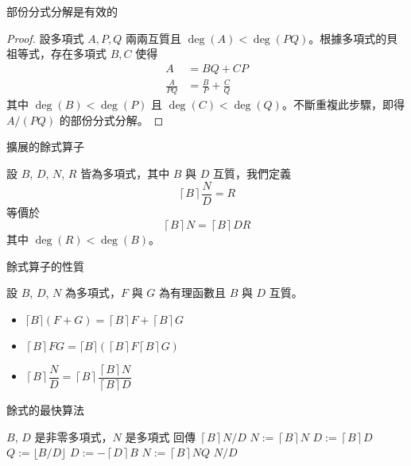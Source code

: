 \documentclass{beamer}
\theoremstyle{remark}
\begin{document}
\begin{CJK}{UTF8}{bsmi}
\begin{frame}{部份分式分解是有效的}
  \begin{proof}
    設多項式 $A,P,Q$ 兩兩互質且 $\deg(A) < \deg(PQ)$。根據多項式的貝祖等式，存在多項式 $B,C$ 使得
    \begin{align*}
      A &= BQ + CP\\
      \frac{A}{PQ} &= \frac{B}{P} + \frac{C}{Q}
    \end{align*}
    其中 $\deg(B) < \deg(P)$ 且 $\deg(C) < \deg(Q)$。不斷重複此步驟，即得 $A/(PQ)$ 的部份分式分解。
  \end{proof}
\end{frame}

\begin{frame}{擴展的餘式算子}
  \begin{definition}
    設 $B$, $D$, $N$, $R$ 皆為多項式，其中 $B$ 與 $D$ 互質，我們定義
    \[\left\lceil B \right\rceil \frac N D = R\]
    等價於
    \[\left\lceil B \right\rceil N = \left\lceil B \right\rceil DR\]
    其中 $\deg(R) < \deg(B)$。
  \end{definition}
\end{frame}

\begin{frame}{餘式算子的性質}
  \begin{theorem}
    設 $B$, $D$, $N$ 為多項式，$F$ 與 $G$ 為有理函數且 $B$ 與 $D$ 互質。
    \begin{itemize}
      \item $\lceil B \rceil \left( F + G \right) = \left\lceil B \right\rceil F + \left\lceil B \right\rceil G$
      \item $\left\lceil B \right\rceil FG = \lceil B \rceil \left( \left\lceil B \right\rceil F \left\lceil B
	\right\rceil G\right)$
      \item $\left\lceil B \right\rceil \dfrac{N}{D} = \left\lceil B \right\rceil \dfrac{\left\lceil B \right\rceil
	N}{\left\lceil B \right\rceil D}$
    \end{itemize}
  \end{theorem}
\end{frame}

\begin{frame}{餘式的最快算法}
  \begin{algorithm}[H]
    \caption{擴展的餘式算子}
    \begin{algorithmic}[1]
      \REQUIRE $B$, $D$ 是非零多項式，$N$ 是多項式
      \ENSURE  回傳 $\left\lceil B \right\rceil N/D$
      \STATE $N := \left\lceil B \right\rceil N$
      \STATE $D := \left\lceil B \right\rceil D$
	\STATE $Q := \lfloor B/D \rfloor$
	\STATE $D := -\left\lceil D \right\rceil B$ 
	\STATE $N := \left\lceil B \right\rceil NQ$
      \ENDWHILE
      \RETURN $N/D$ 
    \end{algorithmic}
  \end{algorithm}
\end{frame}


\end{CJK}
\end{document}
